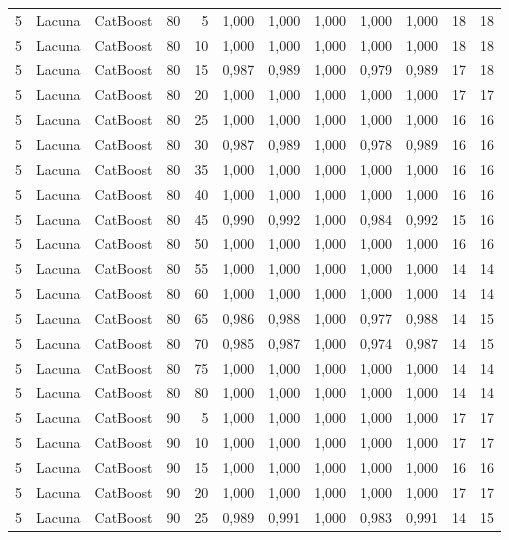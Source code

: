 \begin{longtable}{@{}rllrrrrrrrrr@{}}
5 & Lacuna & CatBoost & 80 & 5 & 1,000 & 1,000 & 1,000 & 1,000 & 1,000 & 18 & 18 \\
5 & Lacuna & CatBoost & 80 & 10 & 1,000 & 1,000 & 1,000 & 1,000 & 1,000 & 18 & 18 \\
5 & Lacuna & CatBoost & 80 & 15 & 0,987 & 0,989 & 1,000 & 0,979 & 0,989 & 17 & 18 \\
5 & Lacuna & CatBoost & 80 & 20 & 1,000 & 1,000 & 1,000 & 1,000 & 1,000 & 17 & 17 \\
5 & Lacuna & CatBoost & 80 & 25 & 1,000 & 1,000 & 1,000 & 1,000 & 1,000 & 16 & 16 \\
5 & Lacuna & CatBoost & 80 & 30 & 0,987 & 0,989 & 1,000 & 0,978 & 0,989 & 16 & 16 \\
5 & Lacuna & CatBoost & 80 & 35 & 1,000 & 1,000 & 1,000 & 1,000 & 1,000 & 16 & 16 \\
5 & Lacuna & CatBoost & 80 & 40 & 1,000 & 1,000 & 1,000 & 1,000 & 1,000 & 16 & 16 \\
5 & Lacuna & CatBoost & 80 & 45 & 0,990 & 0,992 & 1,000 & 0,984 & 0,992 & 15 & 16 \\
5 & Lacuna & CatBoost & 80 & 50 & 1,000 & 1,000 & 1,000 & 1,000 & 1,000 & 16 & 16 \\
5 & Lacuna & CatBoost & 80 & 55 & 1,000 & 1,000 & 1,000 & 1,000 & 1,000 & 14 & 14 \\
5 & Lacuna & CatBoost & 80 & 60 & 1,000 & 1,000 & 1,000 & 1,000 & 1,000 & 14 & 14 \\
5 & Lacuna & CatBoost & 80 & 65 & 0,986 & 0,988 & 1,000 & 0,977 & 0,988 & 14 & 15 \\
5 & Lacuna & CatBoost & 80 & 70 & 0,985 & 0,987 & 1,000 & 0,974 & 0,987 & 14 & 15 \\
5 & Lacuna & CatBoost & 80 & 75 & 1,000 & 1,000 & 1,000 & 1,000 & 1,000 & 14 & 14 \\
5 & Lacuna & CatBoost & 80 & 80 & 1,000 & 1,000 & 1,000 & 1,000 & 1,000 & 14 & 14 \\
5 & Lacuna & CatBoost & 90 & 5 & 1,000 & 1,000 & 1,000 & 1,000 & 1,000 & 17 & 17 \\
5 & Lacuna & CatBoost & 90 & 10 & 1,000 & 1,000 & 1,000 & 1,000 & 1,000 & 17 & 17 \\
5 & Lacuna & CatBoost & 90 & 15 & 1,000 & 1,000 & 1,000 & 1,000 & 1,000 & 16 & 16 \\
5 & Lacuna & CatBoost & 90 & 20 & 1,000 & 1,000 & 1,000 & 1,000 & 1,000 & 17 & 17 \\
5 & Lacuna & CatBoost & 90 & 25 & 0,989 & 0,991 & 1,000 & 0,983 & 0,991 & 14 & 15 \\

\end{longtable}
